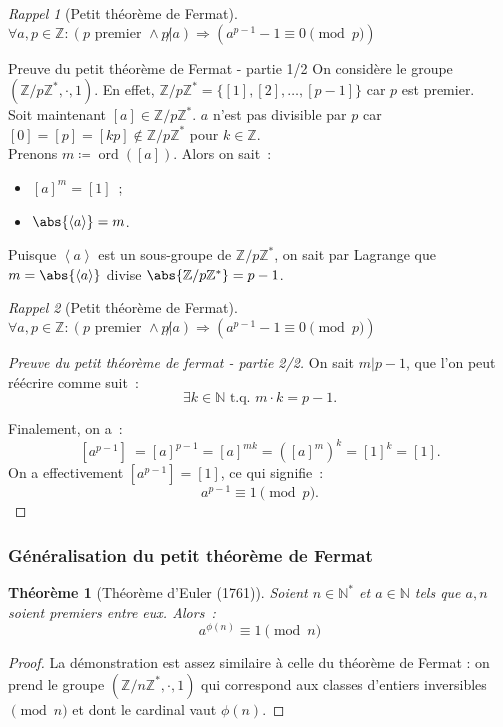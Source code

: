 \documentclass[10pt, mathserif]{beamer}
\DeclareMathOperator{\ord}{ord}
\newcommand{\tq}{\text{ t.q. }}
\newcommand{\Z}{\mathbb Z}
\newcommand{\N}{\mathbb N}
\newcommand{\eng}[1]{\left\langle#1\right\rangle}
\newtheorem{thm}{Théorème}[section]
\theoremstyle{definition}
\theoremstyle{remark}
\newtheorem*{rap}{Rappel}
\begin{document}
	\begin{frame}
		\begin{rap}[Petit théorème de Fermat]
			$\forall a, p \in \Z : (p \text{ premier } \land p \not | a) \Rightarrow \left(a^{p-1} -1 \equiv 0 \pmod p\right)$
		\end{rap}

		\begin{block}{Preuve du petit théorème de Fermat - partie 1/2}
			On considère le groupe $\left(\Z/p\Z^*, \cdot, 1\right)$. En effet, $\Z/p\Z^* = \{[1], [2], \dotsc, [p-1]\}$ car $p$ est premier. \\
			Soit maintenant $[a] \in \Z/p\Z^*$. $a$ n'est pas divisible par $p$ car $[0] = [p] = [kp] \not \in \Z/p\Z^*$ pour $k \in \Z$. \\
			Prenons $m \coloneqq \ord([a])$. Alors on sait~:
			\begin{itemize}
				\item $[a]^m = [1]$~;
				\item $\abs{\eng a} = m$.
			\end{itemize}

			Puisque $\eng a$ est un sous-groupe de $\Z/p\Z^*$, on sait par Lagrange que $m = \abs{\eng a}$ divise $\abs{\Z/p\Z^*} = p-1$.
		\end{block}
	\end{frame}

	\begin{frame}
		\begin{rap}[Petit théorème de Fermat]
			$\forall a, p \in \Z : (p \text{ premier } \land p \not | a) \Rightarrow \left(a^{p-1} -1 \equiv 0 \pmod p\right)$
		\end{rap}

		\begin{proof}[Preuve du petit théorème de fermat - partie 2/2]
			On sait $m | p-1$, que l'on peut réécrire comme suit~:
			\[\exists k \in \N \tq m \cdot k = p-1.\]

			Finalement, on a~:
			\[\left[a^{p-1}\right]\ = [a]^{p-1} = [a]^{mk} = \left([a]^m\right)^k = [1]^k = [1].\]
			On a effectivement $\left[a^{p-1}\right] = [1]$, ce qui signifie~:
			\[a^{p-1} \equiv 1 \pmod p.\]
		\end{proof}
	\end{frame}

	\begin{frame}
		\frametitle{Généralisation du petit théorème de Fermat}

		\begin{thm}[Théorème d'Euler (1761)]
			Soient $n \in \N^*$ et $a \in \N$ tels que $a, n$ soient premiers entre eux. Alors~:
			\[a^{\phi(n)} \equiv 1 \pmod n\]
		\end{thm}

		\begin{proof}
			La démonstration est assez similaire à celle du théorème de Fermat : on prend le groupe $(\Z/n\Z^*, \cdot, 1)$ qui correspond aux classes
			d'entiers inversibles $\pmod n$ et dont le cardinal vaut $\phi(n)$.
		\end{proof}
	\end{frame}
\end{document}
